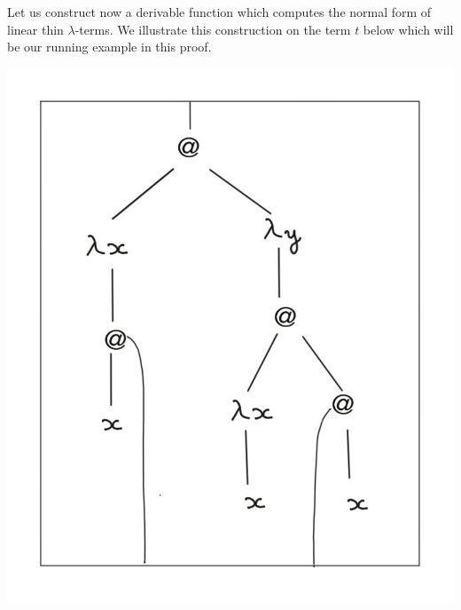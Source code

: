 Let us construct now a derivable function which computes the normal form of linear thin $\lambda$-terms. We illustrate this construction on the term $t$ below which will be our running example in this proof. 
\begin{center}
\includegraphics[scale=.15]{MyPic14.jpg}
\end{center}

